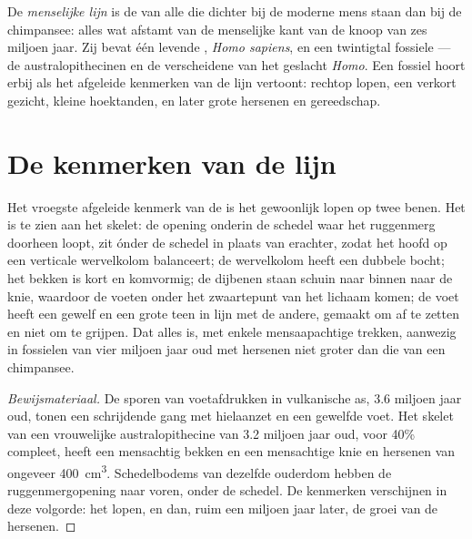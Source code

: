 \begin{definition}\label{def:g12:human-evolution:lineage}
De \emph{menselijke lijn} is de  van alle
 die dichter bij de moderne mens staan dan bij de chimpansee: alles
wat afstamt van de menselijke kant van de knoop van zes miljoen jaar. Zij
bevat één levende , \emph{Homo sapiens}, en een twintigtal fossiele
--- de australopithecinen en de verscheidene  van het geslacht
\emph{Homo}. Een fossiel hoort erbij als het afgeleide kenmerken van de
lijn vertoont: rechtop lopen, een verkort gezicht, kleine hoektanden, en
later grote hersenen en gereedschap.
\end{definition}

\section{De kenmerken van de lijn}

\begin{proposition}\label{prop:g12:human-evolution:bipedalism}
Het vroegste afgeleide kenmerk van de  is het gewoonlijk
lopen op twee benen. Het is te zien aan het skelet: de opening onderin de
schedel waar het ruggenmerg doorheen loopt, zit ónder de schedel in plaats
van erachter, zodat het hoofd op een verticale wervelkolom balanceert; de
wervelkolom heeft een dubbele bocht; het bekken is kort en komvormig; de
dijbenen staan schuin naar binnen naar de knie, waardoor de voeten onder
het zwaartepunt van het lichaam komen; de voet heeft een gewelf en een
grote teen in lijn met de andere, gemaakt om af te zetten en niet om te
grijpen. Dat alles is, met enkele mensaapachtige trekken, aanwezig in
fossielen van vier miljoen jaar oud met hersenen niet groter dan die van
een chimpansee.
\end{proposition}
\begin{proof}[Bewijsmateriaal]
De sporen van voetafdrukken in vulkanische as, 3.6 miljoen jaar oud, tonen
een schrijdende gang met hielaanzet en een gewelfde voet. Het skelet van
een vrouwelijke australopithecine van 3.2 miljoen jaar oud, voor 40\%
compleet, heeft een mensachtig bekken en een mensachtige knie en hersenen
van ongeveer \qty{400}{cm^3}. Schedelbodems van dezelfde ouderdom hebben
de ruggenmergopening naar voren, onder de schedel. De kenmerken verschijnen
in deze volgorde: het lopen, en dan, ruim een miljoen jaar later, de groei
van de hersenen.
\end{proof}

